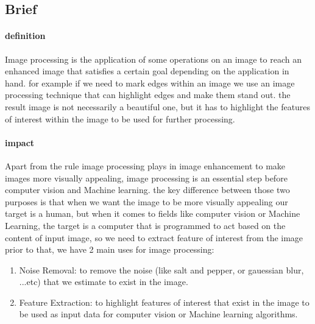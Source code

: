 \subsection{Brief}
\paragraph{definition}
Image processing is the application of some operations on an image to reach an enhanced image
that satisfies a certain goal depending on the application in hand.
for example if we need to mark edges within an image we use an image processing
technique that can highlight edges and make them stand out.
the result image is not necessarily a beautiful one, but it has to highlight
the features of interest within the image to be used for further processing.

\paragraph{impact}
Apart from the rule image processing plays in image enhancement to make images more visually appealing,
image processing is an essential step before computer vision and Machine learning.
the key difference between those two purposes is that when we want the image to be more visually appealing
our target is a human, but when it comes to fields like computer vision or Machine Learning, the target is a computer that is programmed 
to act based on the content of input image, so we need to extract feature of interest from the image prior to that, 
we have 2 main uses for image processing:
\begin{enumerate}
	\item Noise Removal: to remove the noise (like salt and pepper, or gauessian blur, ...etc) that we estimate to exist in the image.
	
	\item Feature Extraction: to highlight features of interest that exist in the image to be used
	as input data for computer vision or Machine learning algorithms.
\end{enumerate}


